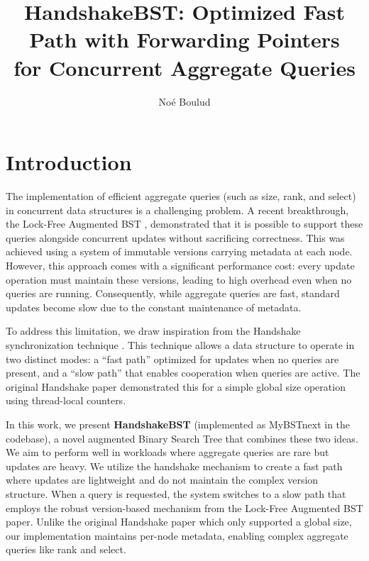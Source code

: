 \documentclass[acmsmall,screen,nonacm]{acmart}
\newcommand{\codestyle}[1]{{{\fontsize{9}{10}\ttfamily #1}}}
\newcommand{\size}{\codestyle{size}}
\newcommand{\rank}{\codestyle{rank}}
\newcommand{\select}{\codestyle{select}}
\begin{document}
\title{HandshakeBST: Optimized Fast Path with Forwarding Pointers \\
for Concurrent Aggregate Queries}

\author{Noé Boulud}

\maketitle

\section{Introduction}

The implementation of efficient aggregate queries (such as \size{}, \rank{}, and \select{}) in concurrent data structures is a challenging problem. A recent breakthrough, the Lock-Free Augmented BST \cite{fatourou2024lockfree}, demonstrated that it is possible to support these queries alongside concurrent updates without sacrificing correctness. This was achieved using a system of immutable versions carrying metadata at each node. However, this approach comes with a significant performance cost: every update operation must maintain these versions, leading to high overhead even when no queries are running. Consequently, while aggregate queries are fast, standard updates become slow due to the constant maintenance of metadata.

To address this limitation, we draw inspiration from the Handshake synchronization technique \cite{sela2025handshake}. This technique allows a data structure to operate in two distinct modes: a ``fast path'' optimized for updates when no queries are present, and a ``slow path'' that enables cooperation when queries are active. The original Handshake paper demonstrated this for a simple global \size{} operation using thread-local counters.

In this work, we present \textbf{HandshakeBST} (implemented as \codestyle{MyBSTnext} in the codebase), a novel augmented Binary Search Tree that combines these two ideas. We aim to perform well in workloads where aggregate queries are rare but updates are heavy. We utilize the handshake mechanism to create a fast path where updates are lightweight and do not maintain the complex version structure. When a query is requested, the system switches to a slow path that employs the robust version-based mechanism from the Lock-Free Augmented BST paper. Unlike the original Handshake paper which only supported a global size, our implementation maintains per-node metadata, enabling complex aggregate queries like \rank{} and \select{}.
\end{document}
